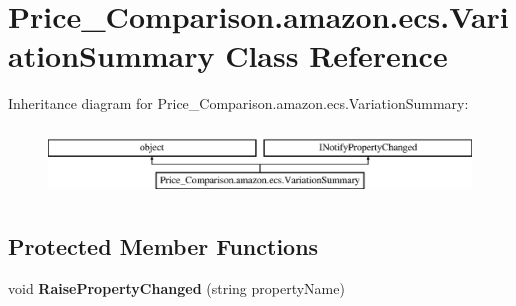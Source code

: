 \hypertarget{class_price___comparison_1_1amazon_1_1ecs_1_1_variation_summary}{\section{Price\-\_\-\-Comparison.\-amazon.\-ecs.\-Variation\-Summary Class Reference}
\label{class_price___comparison_1_1amazon_1_1ecs_1_1_variation_summary}
}


 


Inheritance diagram for Price\-\_\-\-Comparison.\-amazon.\-ecs.\-Variation\-Summary\-:\begin{figure}[H]
\begin{center}
\leavevmode
\includegraphics[height=1.854305cm]{class_price___comparison_1_1amazon_1_1ecs_1_1_variation_summary}
\end{center}
\end{figure}
\subsection*{Protected Member Functions}
\begin{DoxyCompactItemize}
\item 
\hypertarget{class_price___comparison_1_1amazon_1_1ecs_1_1_variation_summary_ad52a4d3b577c74c63ea33af209fd3153}{void {\bfseries Raise\-Property\-Changed} (string property\-Name)}\label{class_price___comparison_1_1amazon_1_1ecs_1_1_variation_summary_ad52a4d3b577c74c63ea33af209fd3153}

\end{DoxyCompactItemize}
